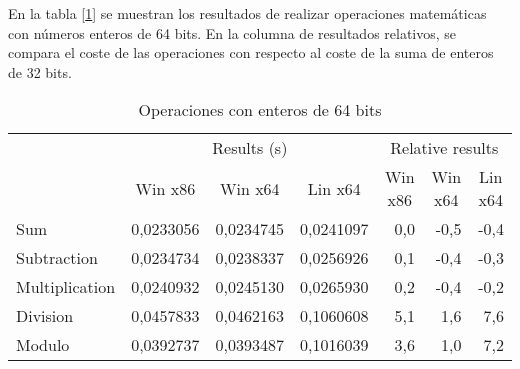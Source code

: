 En la tabla [\ref{tab:int64}] se muestran los resultados de realizar operaciones matemáticas con números enteros de 64 bits. En la columna de resultados relativos, se compara el coste de las operaciones con respecto al coste de la suma de enteros de 32 bits.\\

\begin{table}[h]
\centering
\begin{tabular}{@{}l|rrr|rrr|@{}}
\cmidrule(l){2-7}
                                     & \multicolumn{3}{c|}{Results (s)}                                                               & \multicolumn{3}{c|}{Relative results}                                                      \\ \cmidrule(l){2-7} 
                                     & \multicolumn{1}{c|}{Win x86} & \multicolumn{1}{c|}{Win x64} & \multicolumn{1}{c|}{Lin x64} & \multicolumn{1}{c|}{Win x86} & \multicolumn{1}{c|}{Win x64} & \multicolumn{1}{c|}{Lin x64} \\ \midrule
\multicolumn{1}{|l|}{Sum}            & 0,0233056                    & 0,0234745                    & 0,0241097                    & 0,0                          & -0,5                         & -0,4                         \\ \cmidrule(r){1-1}
\multicolumn{1}{|l|}{Subtraction}    & 0,0234734                    & 0,0238337                    & 0,0256926                    & 0,1                          & -0,4                         & -0,3                         \\ \cmidrule(r){1-1}
\multicolumn{1}{|l|}{Multiplication} & 0,0240932                    & 0,0245130                    & 0,0265930                    & 0,2                          & -0,4                         & -0,2                         \\ \cmidrule(r){1-1}
\multicolumn{1}{|l|}{Division}       & 0,0457833                    & 0,0462163                    & 0,1060608                    & 5,1                          & 1,6                          & 7,6                          \\ \cmidrule(r){1-1}
\multicolumn{1}{|l|}{Modulo}         & 0,0392737                    & 0,0393487                    & 0,1016039                    & 3,6                          & 1,0                          & 7,2                          \\ \bottomrule
\end{tabular}
\caption{Operaciones con enteros de 64 bits}
\label{tab:int64}
\end{table}

